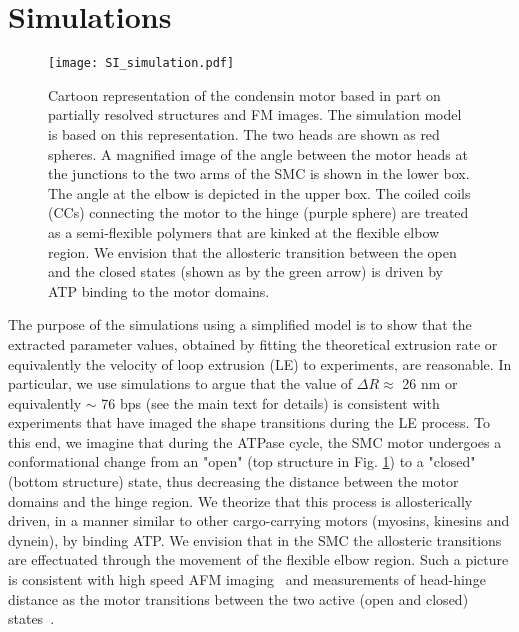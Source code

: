 \documentclass[aps,preprint]{revtex4-1}
\begin{document}
\tableofcontents
\newpage


\section{Simulations}
\begin{figure}[]
\centering
\texttt{[image: SI\_simulation.pdf]}
\caption{\label{fig:simulation} Cartoon representation of the condensin motor based in part on partially resolved structures and FM images.  The simulation model is based on this representation. The two heads are shown as red spheres. A magnified image of the angle between the motor heads at the junctions to the two arms of the SMC is shown in the lower box. The angle at the elbow is depicted in the upper box. The coiled coils (CCs) connecting the motor to the hinge (purple sphere) are treated as a semi-flexible polymers that are kinked  at the flexible elbow region. We envision that the allosteric transition between the open and the closed states (shown as by the green arrow) is driven by ATP binding to the motor domains. 
}
\end{figure}
The purpose of the simulations using a simplified model is to show that the extracted parameter values, obtained by fitting the theoretical extrusion rate or equivalently the velocity of loop extrusion (LE) to experiments, are reasonable. In particular, we use simulations to argue that the value of $\Delta R \approx$ 26 nm or equivalently $\sim$ 76 bps (see the main text for details) is consistent with experiments that have imaged the shape transitions during the LE process. To this end, we imagine that during the ATPase cycle, the SMC motor undergoes a conformational change from an "open" (top structure in Fig. \ref{fig:simulation}) to a "closed"  (bottom structure) state, thus decreasing  the distance between the motor domains and the hinge region. We theorize that this process is allosterically driven, in a manner similar to other cargo-carrying  motors (myosins, kinesins and dynein), by binding ATP. We envision that in the SMC the allosteric transitions are effectuated through the movement of the flexible elbow region. Such a picture is consistent with high speed AFM imaging~\cite{eeftens2016condensin} and measurements of head-hinge distance as the motor transitions between the two active (open and closed) states~\cite{ryu2020condensin}. 
\end{document}
